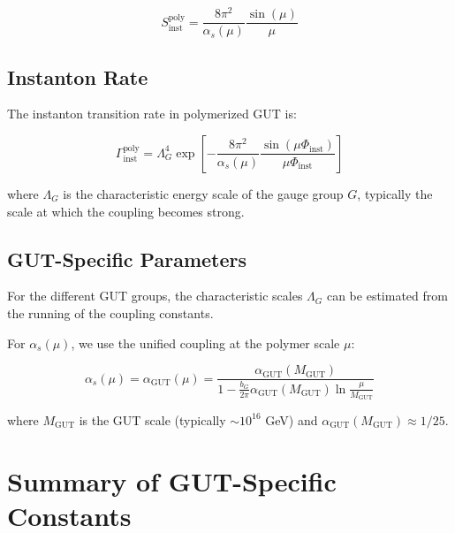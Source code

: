 \documentclass[11pt]{article}
\begin{document}
\begin{equation}
S_{\mathrm{inst}}^{\mathrm{poly}} = \frac{8\pi^2}{\alpha_s(\mu)}\frac{\sin(\mu)}{\mu}
\end{equation}

\subsection{Instanton Rate}

The instanton transition rate in polymerized GUT is:

\begin{equation}
\boxed{
\Gamma_{\mathrm{inst}}^{\mathrm{poly}} = \Lambda_G^4 \exp\left[-\frac{8\pi^2}{\alpha_s(\mu)}\frac{\sin(\mu\Phi_{\mathrm{inst}})}{\mu\Phi_{\mathrm{inst}}}\right]
}
\end{equation}

where $\Lambda_G$ is the characteristic energy scale of the gauge group $G$, typically the scale at which the coupling becomes strong.

\subsection{GUT-Specific Parameters}

For the different GUT groups, the characteristic scales $\Lambda_G$ can be estimated from the running of the coupling constants. 

For $\alpha_s(\mu)$, we use the unified coupling at the polymer scale $\mu$:

\begin{equation}
\alpha_s(\mu) = \alpha_{\mathrm{GUT}}(\mu) = \frac{\alpha_{\mathrm{GUT}}(M_{\mathrm{GUT}})}{1 - \frac{b_G}{2\pi}\alpha_{\mathrm{GUT}}(M_{\mathrm{GUT}})\ln\frac{\mu}{M_{\mathrm{GUT}}}}
\end{equation}

where $M_{\mathrm{GUT}}$ is the GUT scale (typically $\sim 10^{16}$ GeV) and $\alpha_{\mathrm{GUT}}(M_{\mathrm{GUT}}) \approx 1/25$.

\section{Summary of GUT-Specific Constants}
\end{document}
